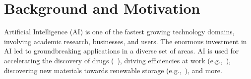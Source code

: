 \section{Background and Motivation}
\label{background}

Artificial Intelligence (AI) is one of the fastest growing technology domains, involving academic research, businesses, and users. 
The enormous investment in AI led to groundbreaking applications in a diverse set of areas.  AI is used for accelerating the discovery of
drugs (~\cite{stark2022equibind}), driving efficiencies at work (e.g.,~\cite{puri2021codenet}), discovering new materials towards renewable storage (e.g.,~\cite{zitnick2020}), and more. 
\cite{Rous08}
%
